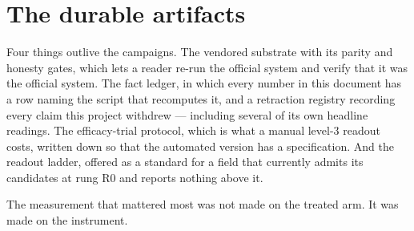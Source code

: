 \section*{The durable artifacts}

Four things outlive the campaigns. The vendored substrate with its parity
and honesty gates, which lets a reader re-run the official system and
verify that it was the official system. The fact ledger, in which every number in
this document has a row naming the script that recomputes it, and a
retraction registry recording every claim this project withdrew ---
including several of its own headline readings. The efficacy-trial
protocol, which is what a manual level-3 readout costs, written down so
that the automated version has a specification. And the readout ladder,
offered as a standard for a field that currently admits its candidates at
rung R0 and reports nothing above it.

The measurement that mattered most was not made on the treated arm. It was
made on the instrument.
